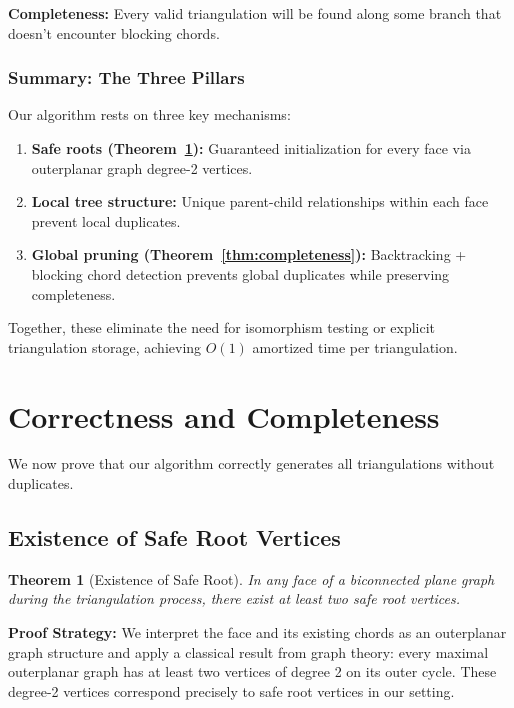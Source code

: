 \documentclass[12pt,a4paper]{article}
\newtheorem{theorem}{Theorem}
\theoremstyle{definition}
\theoremstyle{remark}
\begin{document}
\textbf{Completeness:} Every valid triangulation will be found along some branch that doesn't encounter blocking chords.

\subsubsection{Summary: The Three Pillars}

Our algorithm rests on three key mechanisms:

\begin{enumerate}
    \item \textbf{Safe roots (Theorem~\ref{thm:safe_root_exists}):} Guaranteed initialization for every face via outerplanar graph degree-2 vertices.
    
    \item \textbf{Local tree structure:} Unique parent-child relationships within each face prevent local duplicates.
    
    \item \textbf{Global pruning (Theorem~\ref{thm:completeness}):} Backtracking + blocking chord detection prevents global duplicates while preserving completeness.
\end{enumerate}

Together, these eliminate the need for isomorphism testing or explicit triangulation storage, achieving $O(1)$ amortized time per triangulation.


\section{Correctness and Completeness}
\label{sec:correctness}

We now prove that our algorithm correctly generates all triangulations without duplicates.

\subsection{Existence of Safe Root Vertices}

\begin{theorem}[Existence of Safe Root]
\label{thm:safe_root_exists}
In any face of a biconnected plane graph during the triangulation process, there exist at least two safe root vertices.
\end{theorem}

\textbf{Proof Strategy:} We interpret the face and its existing chords as an outerplanar graph structure and apply a classical result from graph theory: every maximal outerplanar graph has at least two vertices of degree 2 on its outer cycle. These degree-2 vertices correspond precisely to safe root vertices in our setting.
\end{document}

